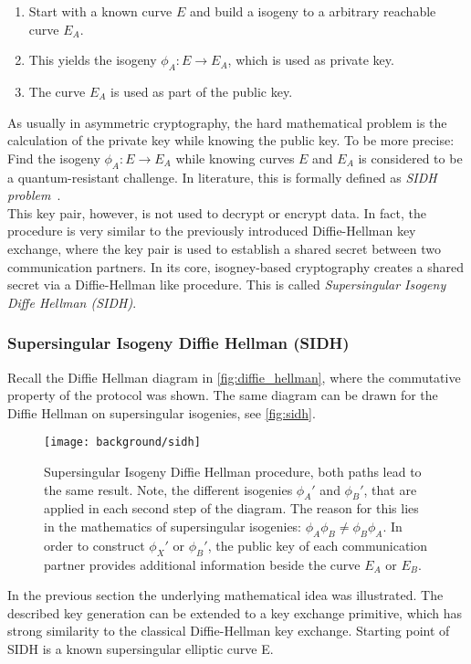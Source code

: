 \begin{enumerate}
\item Start with a known curve $E$ and build a isogeny to a arbitrary reachable curve $E_A$.
\item This yields the isogeny $\phi_A: E \to E_A$, which is used as private key.
\item The curve $E_A$ is used as part of the public key.
\end{enumerate}
As usually in asymmetric cryptography, the hard mathematical problem is the calculation of the private key while knowing the public key. To be more precise: Find the isogeny $\phi_A: E \to E_A$ while knowing curves $E$ and $E_A$ is considered to be a quantum-resistant challenge. In literature, this is formally defined as \textit{SIDH problem}~\parencite{sike2020spec}. 
\\
This key pair, however, is not used to decrypt or encrypt data. In fact, the procedure is very similar to the previously introduced Diffie-Hellman key exchange, where the key pair is used to establish a shared secret between two communication partners.
In its core, isogney-based cryptography creates a shared secret via a Diffie-Hellman like procedure. This is called \textit{Supersingular Isogeny Diffe Hellman (SIDH)}.

\subsubsection{Supersingular Isogeny Diffie Hellman (SIDH)}

Recall the Diffie Hellman diagram in  \autoref{fig:diffie_hellman}, where the commutative property of the protocol was shown. The same diagram can be drawn for the Diffie Hellman on supersingular isogenies, see \autoref{fig:sidh}. 
\begin{figure}[H]
  \centering
  \texttt{[image: background/sidh]}
  \caption[Supersingular Isogeny Diffie Hellman diagram]{Supersingular Isogeny Diffie Hellman procedure, both paths lead to the same result. Note, the different isogenies $\phi_{A}'$ and $\phi_{B}'$, that are applied in each second step of the diagram. The reason for this lies in the mathematics of supersingular isogenies: $\phi_{A} \phi_{B} \neq \phi_{B} \phi_{A}$. In order to construct $\phi_{X}'$ or $\phi_{B}'$, the public key of each communication partner provides additional information beside the curve $E_A$ or $E_B$.~\parencite{costello2016gentle}}
  \label{fig:sidh}
\end{figure}
In the previous section the underlying mathematical idea was illustrated. The described key generation can be extended to a key exchange primitive, which has strong similarity to the classical Diffie-Hellman key exchange. Starting point of SIDH is a known supersingular elliptic curve E. 

